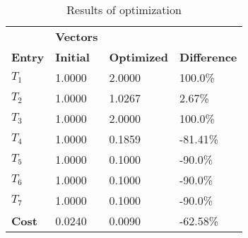 \begin{table}[H]
\centering
\begin{tabular}{llll}
\textbf{}      & \cellcolor[HTML]{EFEFEF}\textbf{Vectors} & \textbf{} & \textbf{}         \\
\rowcolor[HTML]{EFEFEF} 
\textbf{Entry} & \textbf{Initial} & \textbf{Optimized} & \textbf{Difference} \\
$T_1$ & 1.0000 & 2.0000 & 100.0\% \\ 
$T_2$ & 1.0000 & 1.0267 & 2.67\% \\ 
$T_3$ & 1.0000 & 2.0000 & 100.0\% \\ 
$T_4$ & 1.0000 & 0.1859 & -81.41\% \\ 
$T_5$ & 1.0000 & 0.1000 & -90.0\% \\ 
$T_6$ & 1.0000 & 0.1000 & -90.0\% \\ 
$T_7$ & 1.0000 & 0.1000 & -90.0\% \\ 
\rowcolor[HTML]{EFEFEF} 
\textbf{Cost}  & 0.0240 & 0.0090 & -62.58\% \\ 
\end{tabular}
\caption{Results of optimization}
\label{tab:OptimizationAnalysis}
\end{table}